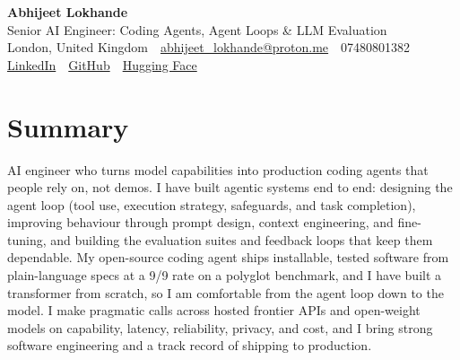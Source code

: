\documentclass[10pt,a4paper]{article}
\newcommand{\sep}{\,\textcolor{accent!60}{\textbar}\,}
\begin{document}
\begin{center}
  {\fontsize{24}{26}\selectfont\bfseries Abhijeet Lokhande}\\[3pt]
  {\color{accent}\large Senior AI Engineer: Coding Agents, Agent Loops \& LLM Evaluation}\\[5pt]
  {\small
    London, United Kingdom \sep
    \href{mailto:abhijeet_lokhande@proton.me}{abhijeet\_lokhande@proton.me} \sep
    07480801382 \\[2pt]
    \href{https://www.linkedin.com/in/ablds/}{LinkedIn} \sep
    \href{https://github.com/abhijeetscode}{GitHub} \sep
    \href{https://huggingface.co/ab-ai}{Hugging Face}
  }
\end{center}
\vspace{2pt}

\section{Summary}
AI engineer who turns model capabilities into production coding agents that people rely on, not demos. I have built agentic systems end to end: designing the agent loop (tool use, execution strategy, safeguards, and task completion), improving behaviour through prompt design, context engineering, and fine-tuning, and building the evaluation suites and feedback loops that keep them dependable. My open-source coding agent ships installable, tested software from plain-language specs at a 9/9 rate on a polyglot benchmark, and I have built a transformer from scratch, so I am comfortable from the agent loop down to the model. I make pragmatic calls across hosted frontier APIs and open-weight models on capability, latency, reliability, privacy, and cost, and I bring strong software engineering and a track record of shipping to production.

\end{document}
